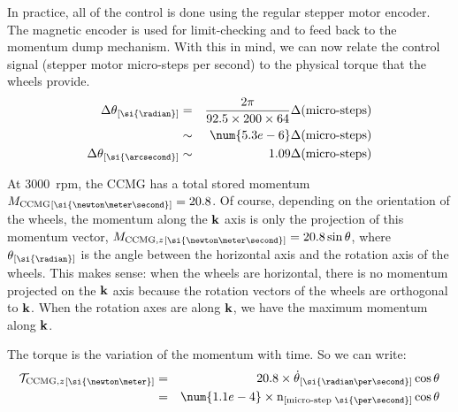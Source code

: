 In practice, all of the control is done using the regular stepper motor encoder. The magnetic encoder is used for limit-checking and to feed back to the momentum dump mechanism. With this in mind, we can now relate the control signal (stepper motor micro-steps per second) to the physical torque that the wheels provide. 
\begin{eqnarray}
\Delta\theta\units{\si{\radian}} &= &\frac{2\pi}{92.5\times 200\times 64}\Delta(\textrm{micro-steps}) \\ 
& \sim & \num{5.3e-6} \Delta(\textrm{micro-steps})\\
\Delta\theta\units{\si{\arcsecond}} &\sim &  1.09 \Delta(\textrm{micro-steps})
\end{eqnarray}

At \num{3000}~rpm, the CCMG has a total stored momentum $\MCCMG\units{\si{\newton\meter\second}} = 20.8$. Of course, depending on the orientation of the wheels, the momentum along the $\textrm{\textbf{k}}$ axis is only the projection of this momentum vector, $\MCCMGz\units{\si{\newton\meter\second}} = 20.8\sin\theta$, where $\theta\units{\si{\radian}}$ is the angle between the horizontal axis and the rotation axis of the wheels. This makes sense: when the wheels are horizontal, there is no momentum projected on the $\textrm{\textbf{k}}$ axis because the rotation vectors of the wheels are orthogonal to $\textrm{\textbf{k}}$. When the rotation axes are along $\textrm{\textbf{k}}$, we have the maximum momentum along $\textrm{\textbf{k}}$. 

The torque is the variation of the momentum with time. So we can write:
\begin{eqnarray}
\ccmgtorque\units{\si{\newton\meter}} &= & 20.8\times \dot{\theta}\units{\si{\radian\per\second}} \cos\theta\\
 &= & \num{1.1e-4}\times \velstepper\units{micro-step~\si{\per\second}}\cos\theta
\end{eqnarray}

\begin{figure}[!ht]
	\centering
	
	\caption{}
	\label{fig:CCMGnocase}
    \end{figure}

